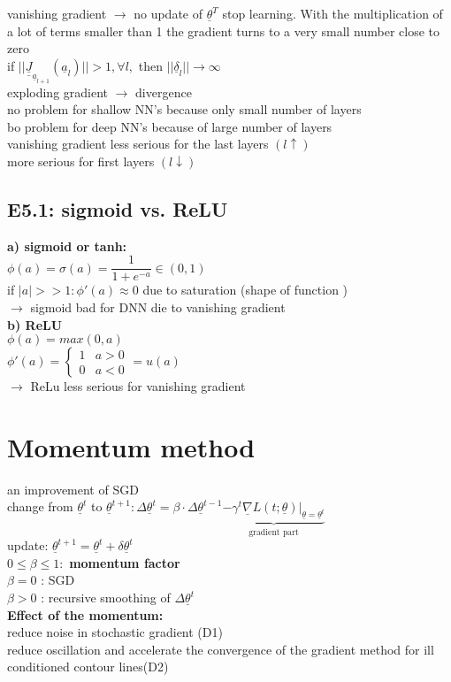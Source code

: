  vanishing gradient $\rightarrow$ no update of $  \underline{\theta}^T $ stop learning. 
 With the multiplication of a lot of terms smaller than 1 the gradient turns to a very small number close to zero \\
\textbullet if $  || \underline{\underline{J}}_{\underline{a}_{l+1}} (\underline{a}_l) || > 1, \forall l, $  then $ ||\underline{\delta}_l || \rightarrow \infty $\\
exploding gradient $\rightarrow$ divergence \\
no problem for shallow NN's because only small number of layers \\
bo problem for deep NN's because of large number of layers \\
\textbullet vanishing gradient less serious for the last layers $ (l \uparrow) $ \\
\textbullet more serious for first layers $ (l \downarrow) $ 
\subsection{E5.1: sigmoid vs. ReLU}
\textbf{a) sigmoid or tanh:} \\
$ \phi (a) = \sigma(a) = \dfrac{1}{1+ e^{-a}} \in (0,1) $ \\
if $ |a| >> 1: \phi'(a) \approx 0 $ due to saturation (shape of function )\\
$\rightarrow$ sigmoid bad for DNN die to vanishing gradient \\
\textbf{b) ReLU}\\
$  \phi (a) = max (0,a) $\\
$  \phi' (a) = \left\lbrace \begin{array}{lc}
1 & a > 0 \\
0 & a < 0
\end{array} \right. = u(a) $ \\
$\rightarrow$ ReLu less serious for vanishing gradient
\section{Momentum method}
an improvement of SGD \\
\textbullet change from $  \underline{\theta}^t $ to $ \underline{\theta} ^{t+1}: \Delta \underline{\theta}^t =\beta \cdot \Delta \underline{\theta}^{t-1}  \underbrace{  - \gamma^t \underline{\nabla}   L(t; \underline{\theta}) |_{\underline{\theta} = \underline{\theta}^t}}_{\text{gradient part}} $\\
\textbullet update: $  \underline{\theta}^{t+1} = \underline{\theta}^{t} + \delta \underline{\theta}^t $ \\
$  0 \leq \beta \leq 1 :  $ \textbf{momentum factor}\\
$  \beta =0 $ : SGD \\
$  \beta > 0  $ : recursive smoothing of $  \Delta \underline{\theta}^t $  \\
\textbf{Effect of the momentum: } \\
\textbullet reduce noise in stochastic gradient (D1) \\
\textbullet reduce oscillation and accelerate the convergence of the gradient method for ill conditioned contour lines(D2) 
